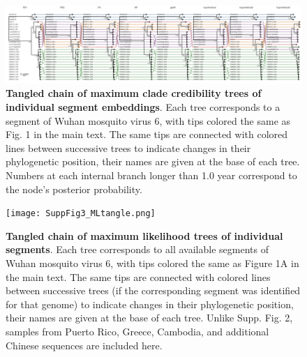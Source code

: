 \documentclass[11pt,twocolumn]{article}
\begin{document}
\begin{figure}
\centering
\includegraphics[width=\textwidth]{SuppFig2_BayesTangle.png}
\caption{
\textbf{Tangled chain of maximum clade credibility trees of individual segment embeddings}.
Each tree corresponds to a segment of Wuhan mosquito virus 6, with tips colored the same as Fig. 1 in the main text.
The same tips are connected with colored lines between successive trees to indicate changes in their phylogenetic position, their names are given at the base of each tree.
Numbers at each internal branch longer than 1.0 year correspond to the node's posterior probability.
}
\end{figure}

\begin{figure}
\centering
\texttt{[image: SuppFig3\_MLtangle.png]}
\caption{
\textbf{Tangled chain of maximum likelihood trees of individual segments}.
Each tree corresponds to all available segments of Wuhan mosquito virus 6, with tips colored the same as Figure 1A in the main text.
The same tips are connected with colored lines between successive trees (if the corresponding segment was identified for that genome) to indicate changes in their phylogenetic position, their names are given at the base of each tree.
Unlike Supp. Fig. 2, samples from Puerto Rico, Greece, Cambodia, and additional Chinese sequences are included here.
}
\end{figure}
\end{document}
